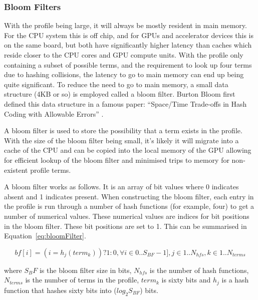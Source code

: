 \subsubsection{Bloom Filters}

With the profile being large, it will always be mostly resident in main memory.
For the CPU system this is off chip, and for GPUs and accelerator devices this
is on the same board, but both have significantly higher latency than caches
which reside closer to the CPU cores and GPU compute units. With the profile
only containing a subset of possible terms, and the requirement to look up four
terms due to hashing collisions, the latency to go to main memory can end up
being quite significant. To reduce the need to go to main memory, a small data
structure (4KB or so) is employed called a bloom filter. Burton Bloom first
defined this data structure in a famous paper: ``Space/Time Trade-offs in Hash
Coding with Allowable Errors'' \cite{bloom1970space}.

A bloom filter is used to store the possibility that a term exists in the
profile. With the size of the bloom filter being small, it's likely it will
migrate into a cache of the CPU and can be copied into the local memory of the
GPU allowing for efficient lookup of the bloom filter and minimised trips to
memory for non-existent profile terms.

A bloom filter works as follows. It is an array of bit values where 0 indicates
absent and 1 indicates present. When constructing the bloom filter, each entry
in the profile is run through a number of hash functions (for example, four) to
get a number of numerical values. These numerical values are indices for bit
positions in the bloom filter. These bit positions are set to 1. This can be
summarised in Equation~\ref{eq:bloomFilter}.

\begin{equation}
\label{eq:bloomFilter}
bf[i] = (i = h_j(term_k) ) ? 1 : 0, \forall i \in 0 .. S_{BF}-1], j \in 1..N_{hfs}, k \in 1..N_{terms}
\end{equation}

where $S_BF$ is the bloom filter size in bits, $N_{hfs}$ is the number of hash
functions, $N_{terms}$ is the number of terms in the profile, $term_k$ is sixty
bits and $h_j$ is a hash function that hashes sixty bits into ($log_2 S_{BF}$)
bits.


